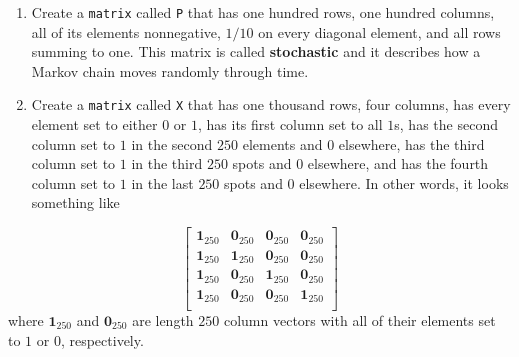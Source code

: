 \documentclass[12pt,krantz2]{krantz}
\begin{document}
\begin{enumerate}
\def\labelenumi{\arabic{enumi}.}
\setcounter{enumi}{1}
\item
  Create a \texttt{matrix} called \texttt{P} that has one hundred rows, one hundred columns, all of its elements nonnegative, \(1/10\) on every diagonal element, and all rows summing to one. This matrix is called \textbf{stochastic} and it describes how a Markov chain moves randomly through time.
\item
  Create a \texttt{matrix} called \texttt{X} that has one thousand rows, four columns, has every element set to either \(0\) or \(1\), has its first column set to all \(1\)s, has the second column set to \(1\) in the second \(250\) elements and \(0\) elsewhere, has the third column set to \(1\) in the third \(250\) spots and \(0\) elsewhere, and has the fourth column set to \(1\) in the last \(250\) spots and \(0\) elsewhere. In other words, it looks something like
\end{enumerate}

\begin{equation} 
  \begin{bmatrix}
  \mathbf{1}_{250}  & \mathbf{0}_{250} & \mathbf{0}_{250} & \mathbf{0}_{250} \\
  \mathbf{1}_{250}  & \mathbf{1}_{250} & \mathbf{0}_{250} & \mathbf{0}_{250} \\
  \mathbf{1}_{250}  & \mathbf{0}_{250} & \mathbf{1}_{250} & \mathbf{0}_{250} \\
  \mathbf{1}_{250}  & \mathbf{0}_{250} & \mathbf{0}_{250} & \mathbf{1}_{250} \\
  \end{bmatrix}
\end{equation}
where \(\mathbf{1}_{250}\) and \(\mathbf{0}_{250}\) are length \(250\) column vectors with all of their elements set to \(1\) or \(0\), respectively.
\end{document}
